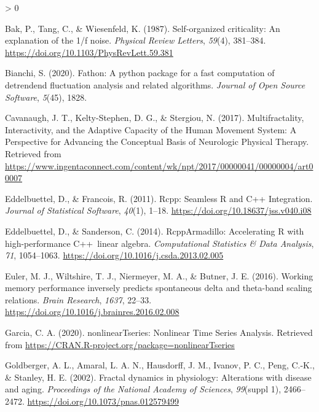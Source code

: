 \documentclass[
  english,
  man]{apa6}
\newlength{\cslhangindent}
\newenvironment{CSLReferences}[2] %
 {%
  \setlength{\parindent}{0pt}
  \ifodd #1 \everypar{\setlength{\hangindent}{\cslhangindent}}\ignorespaces\fi
  \ifnum #2 > 0
  \setlength{\parskip}{#2\baselineskip}
  \fi
 }%
 {}
\begin{document}
\hypertarget{refs}{}
\begin{CSLReferences}{1}{0}
\leavevmode\hypertarget{ref-bakSelforganizedCriticalityExplanation1987}{}%
Bak, P., Tang, C., \& Wiesenfeld, K. (1987). Self-organized criticality: {An} explanation of the 1/f noise. \emph{Physical Review Letters}, \emph{59}(4), 381--384. \url{https://doi.org/10.1103/PhysRevLett.59.381}

\leavevmode\hypertarget{ref-bianchi2020}{}%
Bianchi, S. (2020). Fathon: A python package for a fast computation of detrendend fluctuation analysis and related algorithms. \emph{Journal of Open Source Software}, \emph{5}(45), 1828.

\leavevmode\hypertarget{ref-cavanaugh2017}{}%
Cavanaugh, J. T., Kelty-Stephen, D. G., \& Stergiou, N. (2017). Multifractality, Interactivity, and the Adaptive Capacity of the Human Movement System: A Perspective for Advancing the Conceptual Basis of Neurologic Physical Therapy. Retrieved from \url{https://www.ingentaconnect.com/content/wk/npt/2017/00000041/00000004/art00007}

\leavevmode\hypertarget{ref-eddelbuettelRcppSeamlessIntegration2011}{}%
Eddelbuettel, D., \& Francois, R. (2011). Rcpp: {Seamless} {R} and {C}++ {Integration}. \emph{Journal of Statistical Software}, \emph{40}(1), 1--18. \url{https://doi.org/10.18637/jss.v040.i08}

\leavevmode\hypertarget{ref-eddelbuettelRcppArmadilloAcceleratingHighperformance2014}{}%
Eddelbuettel, D., \& Sanderson, C. (2014). {RcppArmadillo}: {Accelerating} {R} with high-performance {C}++~linear algebra. \emph{Computational Statistics \& Data Analysis}, \emph{71}, 1054--1063. \url{https://doi.org/10.1016/j.csda.2013.02.005}

\leavevmode\hypertarget{ref-eulerWorkingMemoryPerformance2016}{}%
Euler, M. J., Wiltshire, T. J., Niermeyer, M. A., \& Butner, J. E. (2016). Working memory performance inversely predicts spontaneous delta and theta-band scaling relations. \emph{Brain Research}, \emph{1637}, 22--33. \url{https://doi.org/10.1016/j.brainres.2016.02.008}

\leavevmode\hypertarget{ref-garciaNonlinearTseriesNonlinearTime2020}{}%
Garcia, C. A. (2020). {nonlinearTseries}: {Nonlinear} {Time} {Series} {Analysis}. Retrieved from \url{https://CRAN.R-project.org/package=nonlinearTseries}

\leavevmode\hypertarget{ref-goldbergerFractalDynamicsPhysiology2002}{}%
Goldberger, A. L., Amaral, L. A. N., Hausdorff, J. M., Ivanov, P. C., Peng, C.-K., \& Stanley, H. E. (2002). Fractal dynamics in physiology: {Alterations} with disease and aging. \emph{Proceedings of the National Academy of Sciences}, \emph{99}(suppl 1), 2466--2472. \url{https://doi.org/10.1073/pnas.012579499}


\end{CSLReferences}
\end{document}
